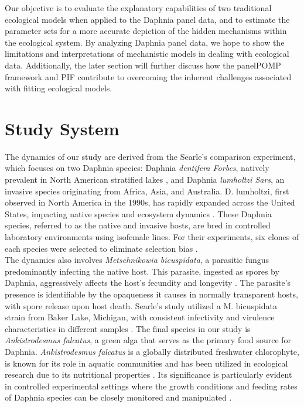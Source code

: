 \documentclass[12pt]{article}
\begin{document}
Our objective is to evaluate the explanatory capabilities of two traditional ecological models when applied to the Daphnia panel data, and to estimate the parameter sets for a more accurate depiction of the hidden mechanisms within the ecological system. By analyzing Daphnia panel data, we hope to show the limitations and interpretations of mechanistic models in dealing with ecological data. Additionally, the later section will further discuss how the panelPOMP framework and PIF contribute to overcoming the inherent challenges associated with fitting ecological models.


\section{Study System}
\label{sec:studysystem}

The dynamics of our study are derived from the Searle's comparison experiment, which focuses on two Daphnia species: Daphnia \textit{dentifera Forbes}, natively prevalent in North American stratified lakes \citep{searle2016salinization}, and Daphnia \textit{lumholtzi Sars}, an invasive species originating from Africa, Asia, and Australia. D. lumholtzi, first observed in North America in the 1990s, has rapidly expanded across the United States, impacting native species and ecosystem dynamics \citep{havel1993daphnia}. These Daphnia species, referred to as the native and invasive hosts, are bred in controlled laboratory environments using isofemale lines. For their experiments, six clones of each species were selected to eliminate selection bias \citep{Searle2016}.\\ 

The dynamics also involves \textit{Metschnikowia bicuspidata}, a parasitic fungus predominantly infecting the native host. This parasite, ingested as spores by Daphnia, aggressively affects the host's fecundity and longevity \citep{duffy2010temporal}. The parasite's presence is identifiable by the opaqueness it causes in normally transparent hosts, with spore release upon host death. Searle's study utilized a M. bicuspidata strain from Baker Lake, Michigan, with consistent infectivity and virulence characteristics in different samples \citep{Searle2016}. The final species in our study is \textit{Ankistrodesmus falcatus}, a green alga that serves as the primary food source for Daphnia. \textit{Ankistrodesmus falcatus} is a globally distributed freshwater chlorophyte, is known for its role in aquatic communities and has been utilized in ecological research due to its nutritional properties \citep{arnold1971ingestion}. Its significance is particularly evident in controlled experimental settings where the growth conditions and feeding rates of Daphnia species can be closely monitored and manipulated \citep{martinez1994effect}.\\
\end{document}

